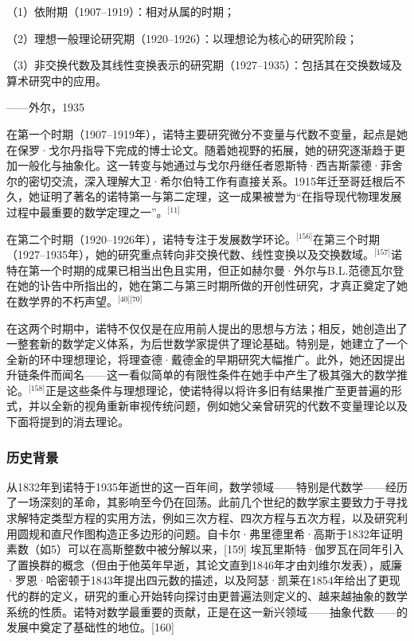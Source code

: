 （1）依附期（1907–1919）：相对从属的时期；

（2）理想一般理论研究期（1920–1926）：以理想论为核心的研究阶段；

（3）非交换代数及其线性变换表示的研究期（1927–1935）：包括其在交换数域及算术研究中的应用。

——外尔，1935

在第一个时期（1907–1919年），诺特主要研究微分不变量与代数不变量，起点是她在保罗·戈尔丹指导下完成的博士论文。随着她视野的拓展，她的研究逐渐趋于更加一般化与抽象化。这一转变与她通过与戈尔丹继任者恩斯特·西吉斯蒙德·菲舍尔的密切交流，深入理解大卫·希尔伯特工作有直接关系。1915年迁至哥廷根后不久，她证明了著名的诺特第一与第二定理，这一成果被誉为“在指导现代物理发展过程中最重要的数学定理之一”。\(^\text{[11]}\)

在第二个时期（1920–1926年），诺特专注于发展数学环论。\(^\text{[156]}\)在第三个时期（1927–1935年），她的研究重点转向非交换代数、线性变换以及交换数域。\(^\text{[157]}\)诺特在第一个时期的成果已相当出色且实用，但正如赫尔曼·外尔与B.L.范德瓦尔登在她的讣告中所指出的，她在第二与第三时期所做的开创性研究，才真正奠定了她在数学界的不朽声望。\(^\text{[40][70]}\)

在这两个时期中，诺特不仅仅是在应用前人提出的思想与方法；相反，她创造出了一整套新的数学定义体系，为后世数学家提供了理论基础。特别是，她建立了一个全新的环中理想理论，将理查德·戴德金的早期研究大幅推广。此外，她还因提出升链条件而闻名——这一看似简单的有限性条件在她手中产生了极其强大的数学推论。\(^\text{[158]}\)正是这些条件与理想理论，使诺特得以将许多旧有结果推广至更普遍的形式，并以全新的视角重新审视传统问题，例如她父亲曾研究的代数不变量理论以及下面将提到的消去理论。
\subsubsection{历史背景}
从1832年到诺特于1935年逝世的这一百年间，数学领域——特别是代数学——经历了一场深刻的革命，其影响至今仍在回荡。此前几个世纪的数学家主要致力于寻找求解特定类型方程的实用方法，例如三次方程、四次方程与五次方程，以及研究利用圆规和直尺作图构造正多边形的问题。自卡尔·弗里德里希·高斯于1832年证明素数（如5）可以在高斯整数中被分解以来，[159] 埃瓦里斯特·伽罗瓦在同年引入了置换群的概念（但由于他英年早逝，其论文直到1846年才由刘维尔发表），威廉·罗恩·哈密顿于1843年提出四元数的描述，以及阿瑟·凯莱在1854年给出了更现代的群的定义，研究的重心开始转向探讨由更普遍法则定义的、越来越抽象的数学系统的性质。诺特对数学最重要的贡献，正是在这一新兴领域——抽象代数——的发展中奠定了基础性的地位。[160]
